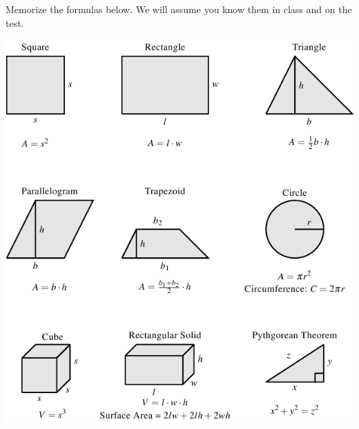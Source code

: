 \documentclass{ximera}
\begin{document}
Memorize the formulas below. We will assume you know them in class and on the test.
\begin{image}
\includegraphics{Optimization3.png}
%
%
%

\end{image}
\end{document}
